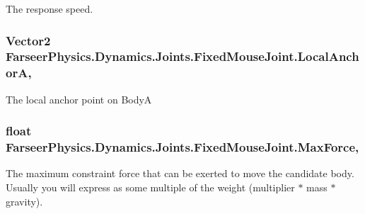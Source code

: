 The response speed. 

\hypertarget{class_farseer_physics_1_1_dynamics_1_1_joints_1_1_fixed_mouse_joint_a66919599e7b6d25f4fec6cc94b4f6a20}{
\subsubsection[{Local\+Anchor\+A}]{\setlength{\rightskip}{0pt plus 5cm}Vector2 Farseer\+Physics.\+Dynamics.\+Joints.\+Fixed\+Mouse\+Joint.\+Local\+Anchor\+A\hspace{0.3cm}{\ttfamily [get]}, {\ttfamily [set]}}}\label{class_farseer_physics_1_1_dynamics_1_1_joints_1_1_fixed_mouse_joint_a66919599e7b6d25f4fec6cc94b4f6a20}


The local anchor point on Body\+A 

\hypertarget{class_farseer_physics_1_1_dynamics_1_1_joints_1_1_fixed_mouse_joint_a15679214ccd9400ab18e4eb99237926a}{
\subsubsection[{Max\+Force}]{\setlength{\rightskip}{0pt plus 5cm}float Farseer\+Physics.\+Dynamics.\+Joints.\+Fixed\+Mouse\+Joint.\+Max\+Force\hspace{0.3cm}{\ttfamily [get]}, {\ttfamily [set]}}}\label{class_farseer_physics_1_1_dynamics_1_1_joints_1_1_fixed_mouse_joint_a15679214ccd9400ab18e4eb99237926a}


The maximum constraint force that can be exerted to move the candidate body. Usually you will express as some multiple of the weight (multiplier $\ast$ mass $\ast$ gravity). 

